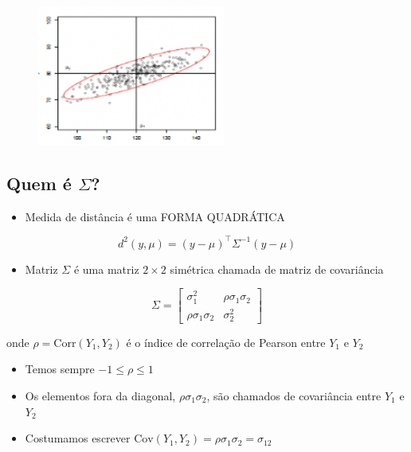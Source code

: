 \documentclass[
  letterpaper,
  DIV=11,
  numbers=noendperiod]{scrartcl}
\providecommand{\tightlist}{%
  \setlength{\itemsep}{0pt}\setlength{\parskip}{0pt}}\usepackage{longtable,booktabs,array}
\begin{document}
\begin{figure}

{\centering \includegraphics[width=0.55\textwidth,height=\textheight]{figs/Aula07/caso_mais_realista2.png}

}

\end{figure}

\hypertarget{quem-uxe9-sigma}{%
\subsection{\texorpdfstring{Quem é
\(\Sigma\)?}{Quem é \textbackslash Sigma?}}\label{quem-uxe9-sigma}}

\begin{itemize}
\tightlist
\item
  Medida de distância é uma FORMA QUADRÁTICA
\end{itemize}

\[ d^2(y,\mu) = (y-\mu)^\top \Sigma^{-1}(y-\mu)\]

\begin{itemize}
\tightlist
\item
  Matriz \(\Sigma\) é uma matriz \(2\times 2\) simétrica chamada de
  matriz de covariância
\end{itemize}

\[ \Sigma = \begin{bmatrix}\sigma_1^2 & \rho\sigma_1\sigma_2\\ \rho\sigma_1\sigma_2 & \sigma_2^2\end{bmatrix}\]

onde \(\rho = \text{Corr}(Y_1, Y_2)\) é o índice de correlação de
Pearson entre \(Y_1\) e \(Y_2\)

\begin{itemize}
\tightlist
\item
  Temos sempre \(-1 \le \rho \le 1\)
\item
  Os elementos fora da diagonal, \(\rho\sigma_1\sigma_2\), são chamados
  de covariância entre \(Y_1\) e \(Y_2\)
\item
  Costumamos escrever
  \(\text{Cov}(Y_1,Y_2) = \rho\sigma_1\sigma_2 = \sigma_{12}\)
\end{itemize}
\end{document}
